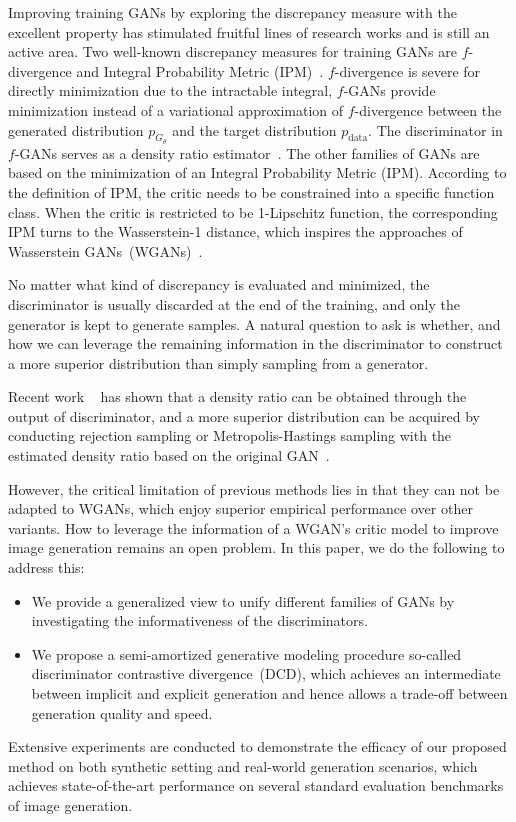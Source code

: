 \documentclass{article}
\begin{document}
Improving training GANs by exploring the discrepancy measure with the excellent property has stimulated fruitful lines of research works and is still an active area. Two well-known discrepancy measures for training GANs are $f$-divergence and Integral Probability Metric (IPM)~\cite{muller1997integral}. $f$-divergence is severe for directly minimization due to the intractable integral, $f$-GANs provide minimization instead of a variational approximation of $f$-divergence between the generated distribution $p_{G_\theta}$ and the target distribution $p_{\text{data}}$. The discriminator in $f$-GANs serves as a density ratio estimator~\cite{uehara2016generative}.
The other families of GANs are based on the minimization of an Integral Probability Metric (IPM). According to the definition of IPM, the critic needs to be constrained into a specific function class. When the critic is restricted to be 1-Lipschitz function, the corresponding IPM turns to the Wasserstein-1 distance, which inspires the approaches of  Wasserstein GANs~(WGANs)~\cite{miyato2018spectral,arjovsky2017wasserstein,gulrajani2017improved}.

No matter what kind of discrepancy is evaluated and minimized, the discriminator is usually discarded at the end of the training, and only the generator is kept to generate samples. A natural question to ask is whether, and how we can leverage the remaining information in the discriminator to construct a more superior distribution than simply sampling from a generator. 

Recent work ~\cite{azadi2018discriminator,turner2018metropolis} has shown that a density ratio can be obtained through the output of discriminator, and a more superior distribution can be acquired by conducting rejection sampling or Metropolis-Hastings sampling with the estimated density ratio based on the original GAN~\cite{goodfellow2014generative}.

However, the critical limitation of previous methods lies in that they can not be adapted to WGANs, which enjoy superior empirical performance over other variants. How to leverage the information of a WGAN's critic model to improve image generation remains an open problem. In this paper, we do the following to address this: 

\begin{itemize}
\vspace{-3pt}
    \item We provide a generalized view to unify different families of GANs by investigating the informativeness of the discriminators.
    \vspace{-1pt}
    \item We propose a semi-amortized generative modeling procedure so-called discriminator contrastive divergence~(DCD), which achieves an intermediate between implicit and explicit generation and hence allows a trade-off between generation quality and speed.
\vspace{-3pt}
\end{itemize}
Extensive experiments are conducted to demonstrate the efficacy of our proposed method on both synthetic setting and real-world generation scenarios, which achieves state-of-the-art performance on several standard evaluation benchmarks of image generation.
\end{document}
